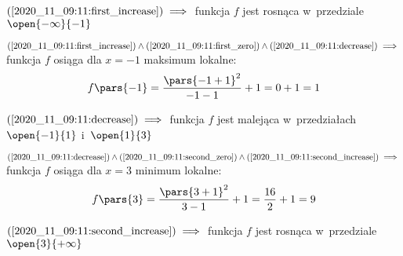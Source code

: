 \begin{description}
    \item \(\mbox{(\ref{2020_11_09:11:first_increase})} \implies\) funkcja \(f\) jest rosnąca w~przedziale \(\open{-\infty}{-1}\)
    \item \(\mbox{(\ref{2020_11_09:11:first_increase})} \land \mbox{(\ref{2020_11_09:11:first_zero})} \land \mbox{(\ref{2020_11_09:11:decrease})} \implies\) funkcja \(f\) osiąga dla \(x = -1\) maksimum lokalne:
        \begin{equation*}
            f\pars{-1}
                = \frac{\pars{-1 + 1}^2}{-1 - 1} + 1
                = 0 + 1
                = 1
        \end{equation*}
    \item \(\mbox{(\ref{2020_11_09:11:decrease})} \implies\) funkcja \(f\) jest malejąca w~przedziałach \(\open{-1}{1}\) i~\(\open{1}{3}\)
    \item \(\mbox{(\ref{2020_11_09:11:decrease})} \land \mbox{(\ref{2020_11_09:11:second_zero})} \land \mbox{(\ref{2020_11_09:11:second_increase})} \implies\) funkcja \(f\) osiąga dla \(x = 3\) minimum lokalne:
        \begin{equation*}
            f\pars{3}
                = \frac{\pars{3 + 1}^2}{3 - 1} + 1
                = \frac{16}{2} + 1
                = 9
        \end{equation*}
    \item \(\mbox{(\ref{2020_11_09:11:second_increase})} \implies\) funkcja \(f\) jest rosnąca w~przedziale \(\open{3}{+\infty}\)
\end{description}
